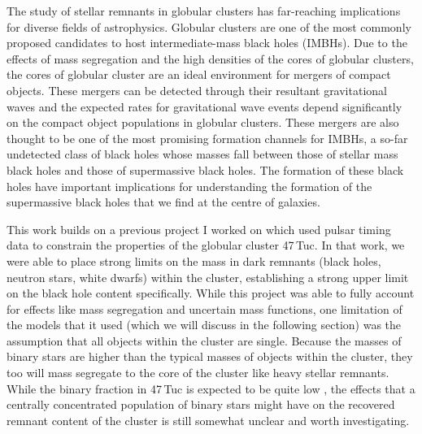 The study of stellar remnants in globular clusters has far-reaching implications for diverse fields
of astrophysics. Globular clusters are one of the most commonly proposed candidates to host
intermediate-mass black holes (IMBHs). Due to  the effects of mass segregation and the high
densities of the cores of globular clusters, the cores of globular cluster are an ideal environment
for mergers of compact objects. These mergers can be detected through their resultant gravitational
waves and the expected rates for gravitational wave events depend significantly on the compact
object populations in globular clusters. These mergers are also thought to be one of the most
promising formation channels for IMBHs, a so-far undetected class of black holes whose masses fall
between those of stellar mass black holes and those of supermassive black holes. The formation of
these black holes have important implications for understanding the formation of the supermassive
black holes that we find at the centre of galaxies.


This work builds on a previous project I worked on which used pulsar timing data to constrain the
properties of the globular cluster 47\,Tuc. In that work, we were able to place strong limits on the
mass in dark remnants (black holes, neutron stars, white dwarfs) within the cluster, establishing a
strong upper limit on the black hole content specifically. While this project was able to fully
account for effects like mass segregation and uncertain mass functions, one limitation of the models
that it used (which we will discuss in the following section) was the assumption that all objects
within the cluster are single. Because the masses of binary stars are higher than the typical masses
of objects within the cluster, they too will mass segregate to the core of the cluster like heavy
stellar remnants. While the binary fraction in 47\,Tuc is expected to be quite low
\citep{Milone2012}, the effects that a centrally concentrated population of binary stars might have
on the recovered remnant content of the cluster is still somewhat unclear and worth investigating.



